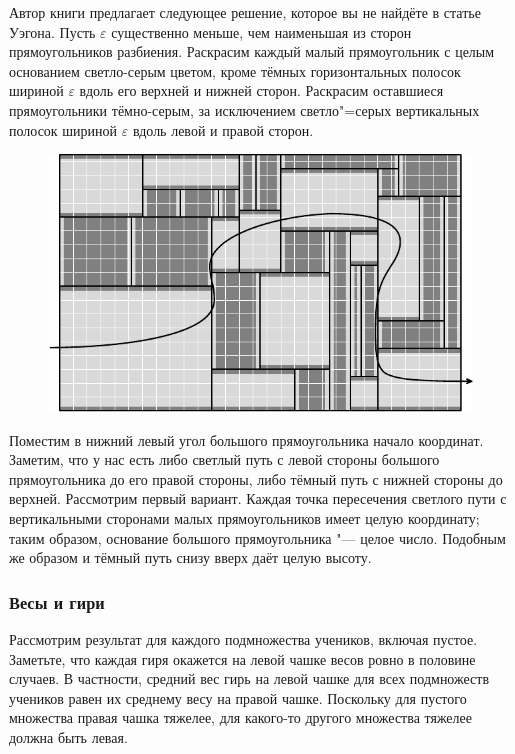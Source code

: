 \documentclass[twoside]{book}
\begin{document}
\medskip
Автор книги предлагает следующее решение, которое вы не найдёте в статье Уэгона.
%
Пусть $\varepsilon$ существенно меньше, чем наименьшая из сторон прямоугольников разбиения.
Раскрасим каждый малый прямоугольник с целым основанием светло-серым цветом, кроме тёмных горизонтальных полосок шириной $\varepsilon$ вдоль его верхней и нижней сторон.
Раскрасим оставшиеся прямоугольники тёмно-серым, за исключением светло"=серых вертикальных полосок шириной $\varepsilon$ вдоль левой и правой сторон.

\begin{figure}[!ht]
\centering
\vspace{\jot}
\includegraphics[scale=.95]{mp/wink-2}

\vspace{-\jot}
\end{figure}


Поместим в нижний левый угол большого прямоугольника начало координат.
Заметим, что у нас есть либо светлый путь с левой стороны большого прямоугольника до его правой стороны, либо тёмный путь с нижней стороны до верхней.
Рассмотрим первый вариант.
Каждая точка пересечения светлого пути с вертикальными сторонами малых прямоугольников имеет целую координату; таким образом, основание большого прямоугольника "--- целое число.
Подобным же образом и тёмный путь снизу вверх даёт целую высоту.

\subsubsection*{Весы и гири} %

Рассмотрим результат для каждого подмножества учеников, включая пустое.
Заметьте, что каждая гиря окажется на левой чашке весов ровно в половине случаев.
В частности, средний вес гирь на левой чашке для всех подмножеств учеников равен их среднему весу на правой чашке.
Поскольку для пустого множества правая чашка тяжелее, 
для какого-то другого множества тяжелее должна быть левая.\heart
\end{document}
